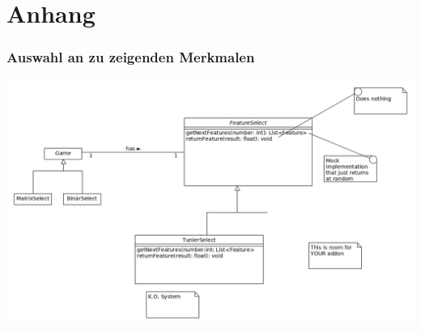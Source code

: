 \documentclass[a4paper]{scrreprt}
\begin{document}
    \chapter{Anhang}
    \subsection{Auswahl an zu zeigenden Merkmalen}
    \label{fig:FeatureSelect}
    \includegraphics[width=\textwidth]{uml/export/FeatureSelect.png}
    
\end{document}
